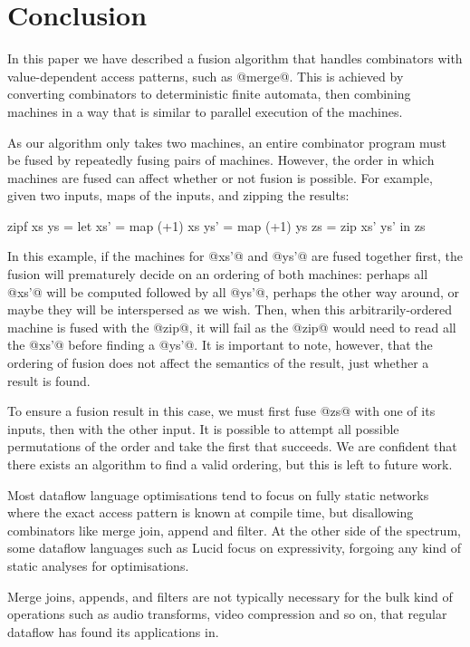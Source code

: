 \section{Conclusion}
\label{s:Conclusion}

In this paper we have described a fusion algorithm that handles combinators with value-dependent access patterns, such as @merge@.
This is achieved by converting combinators to deterministic finite automata, then combining machines in a way that is similar to parallel execution of the machines.

As our algorithm only takes two machines, an entire combinator program must be fused by repeatedly fusing pairs of machines.
However, the order in which machines are fused can affect whether or not fusion is possible.
For example, given two inputs, maps of the inputs, and zipping the results:

\begin{code}
zipf xs ys
 = let xs' = map (+1) xs
       ys' = map (+1) ys
       zs  = zip xs' ys'
   in  zs
\end{code}

In this example, if the machines for @xs'@ and @ys'@ are fused together first, the fusion will prematurely decide on an ordering of both machines: perhaps all @xs'@ will be computed followed by all @ys'@, perhaps the other way around, or maybe they will be interspersed as we wish.
Then, when this arbitrarily-ordered machine is fused with the @zip@, it will fail as the @zip@ would need to read all the @xs'@ before finding a @ys'@.
It is important to note, however, that the ordering of fusion does not affect the semantics of the result, just whether a result is found.

To ensure a fusion result in this case, we must first fuse @zs@ with one of its inputs, then with the other input.
It is possible to attempt all possible permutations of the order and take the first that succeeds.
We are confident that there exists an algorithm to find a valid ordering, but this is left to future work.


Most dataflow language optimisations tend to focus on fully static networks where the exact access pattern is known at compile time\cite{thies2002streamit}, but disallowing combinators like merge join, append and filter.
At the other side of the spectrum, some dataflow languages such as Lucid\cite{stephens1997survey} focus on expressivity, forgoing any kind of static analyses for optimisations.

Merge joins, appends, and filters are not typically necessary for the bulk kind of operations such as audio transforms, video compression and so on, that regular dataflow has found its applications in\cite{johnston2004advances}.

